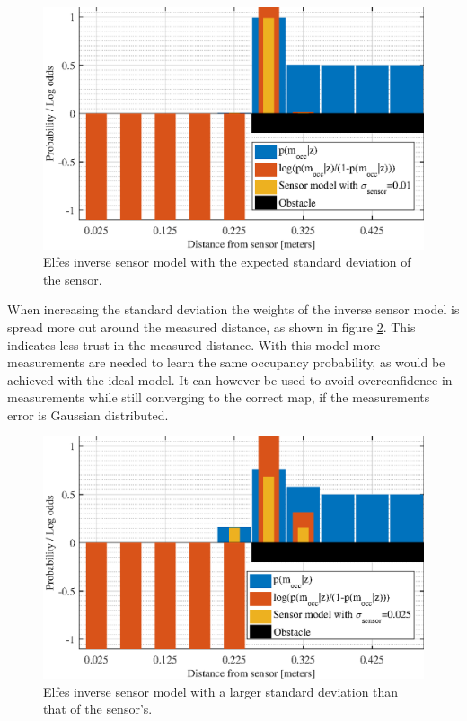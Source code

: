 \begin{figure}
	\centering
	\includegraphics[scale=1.0]{figures/static_mapping/sensor_model_std_dev01}
	\caption{Elfes inverse sensor model with the expected standard deviation of the sensor.}
	\label{fig:sensor_model_std_dev01}
\end{figure}

When increasing the standard deviation the weights of the inverse sensor model is spread more out around the measured distance, as shown in figure \ref{fig:sensor_model_std_dev025}. This indicates less trust in the measured distance. With this model more measurements are needed to learn the same occupancy probability, as would be achieved with the ideal model. It can however be used to avoid overconfidence in measurements while still converging to the correct map, if the measurements error is Gaussian distributed.

\begin{figure}
	\centering
	\includegraphics[scale=1.0]{figures/static_mapping/sensor_model_std_dev025}
	\caption{Elfes inverse sensor model with a larger standard deviation than that of the sensor's.}
	\label{fig:sensor_model_std_dev025}
\end{figure}

